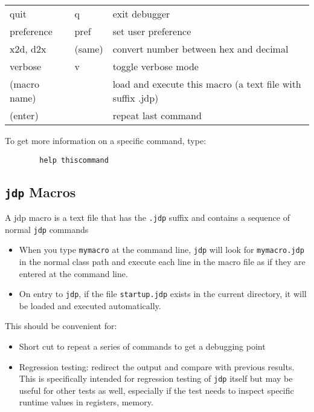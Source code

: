 \begin{tabular}{|l|l|l|}
quit          & q   & exit debugger                                             \\ 
preference    & pref & set user preference                                      \\ 
x2d, d2x      & (same) & convert number between hex and decimal                 \\
verbose       & v   & toggle verbose mode                                       \\ 
(macro name)  &   & load and execute this macro (a text file with suffix .jdp)  \\ 
(enter)       &   & repeat last command                                         \\ \hline 
\end{tabular}

To get more information on a specific command, type: 
\begin{verbatim}
        help thiscommand
\end{verbatim}


\subsection{ {\tt jdp} Macros}
A jdp macro is a text file that has the {\tt .jdp} suffix and contains a sequence of normal {\tt jdp} commands

\begin{itemize}
\item When you type {\tt mymacro} at the command line, {\tt jdp} will look for 
{\tt mymacro.jdp}
 in the normal class path and execute each line in the macro file as if 
 they are entered at the command line.
\item On entry to {\tt jdp}, if the file {\tt startup.jdp} exists in the current directory, 
 it will be loaded and executed automatically.
\end{itemize}

This should be convenient for:
\begin{itemize}
\item Short cut to repeat a series of commands to get a debugging point
\item Regression testing:  redirect the output and compare with previous 
 results.  This is specifically intended for regression testing of {\tt jdp} 
 itself but  may be useful for other tests as well, especially if the test 
 needs to inspect specific runtime values in registers, memory.
\end{itemize}

